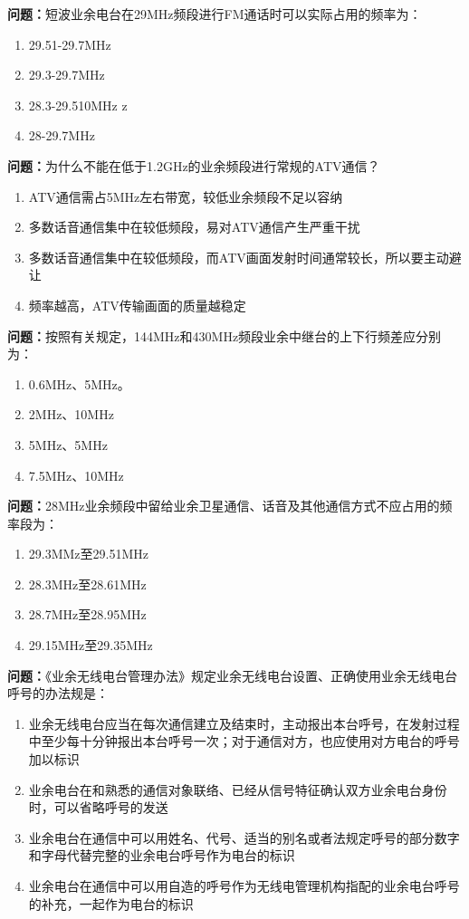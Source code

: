 \bigskip


\noindent\textbf{问题：}短波业余电台在29MHz频段进行FM通话时可以实际占用的频率为：
\begin{enumerate}[label=\Alph*), leftmargin=3em]
\item 29.51-29.7MHz
\item 29.3-29.7MHz
\item 28.3-29.510MHz z
\item 28-29.7MHz
\end{enumerate}

\bigskip


\noindent\textbf{问题：}为什么不能在低于1.2GHz的业余频段进行常规的ATV通信？
\begin{enumerate}[label=\Alph*), leftmargin=3em]
\item ATV通信需占5MHz左右带宽，较低业余频段不足以容纳
\item 多数话音通信集中在较低频段，易对ATV通信产生严重干扰
\item 多数话音通信集中在较低频段，而ATV画面发射时间通常较长，所以要主动避让
\item 频率越高，ATV传输画面的质量越稳定
\end{enumerate}

\bigskip


\noindent\textbf{问题：}按照有关规定，144MHz和430MHz频段业余中继台的上下行频差应分别为：
\begin{enumerate}[label=\Alph*), leftmargin=3em]
\item 0.6MHz、5MHz。
\item 2MHz、10MHz
\item 5MHz、5MHz
\item 7.5MHz、10MHz
\end{enumerate}

\bigskip


\noindent\textbf{问题：}28MHz业余频段中留给业余卫星通信、话音及其他通信方式不应占用的频率段为：
\begin{enumerate}[label=\Alph*), leftmargin=3em]
\item 29.3MMz至29.51MHz
\item 28.3MHz至28.61MHz
\item 28.7MHz至28.95MHz
\item 29.15MHz至29.35MHz
\end{enumerate}

\bigskip


\noindent\textbf{问题：}《业余无线电台管理办法》规定业余无线电台设置、正确使用业余无线电台呼号的办法规是：
\begin{enumerate}[label=\Alph*), leftmargin=3em]
\item 业余无线电台应当在每次通信建立及结束时，主动报出本台呼号，在发射过程中至少每十分钟报出本台呼号一次；对于通信对方，也应使用对方电台的呼号加以标识
\item 业余电台在和熟悉的通信对象联络、已经从信号特征确认双方业余电台身份时，可以省略呼号的发送
\item 业余电台在通信中可以用姓名、代号、适当的别名或者法规定呼号的部分数字和字母代替完整的业余电台呼号作为电台的标识
\item 业余电台在通信中可以用自造的呼号作为无线电管理机构指配的业余电台呼号的补充，一起作为电台的标识
\end{enumerate}

